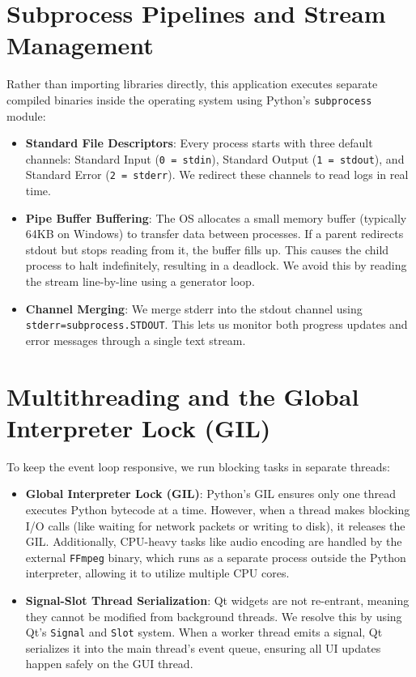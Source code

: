 \documentclass[12pt]{report}
\begin{document}
\section{Subprocess Pipelines and Stream Management}
Rather than importing libraries directly, this application executes separate compiled binaries inside the operating system using Python's \texttt{subprocess} module:
\begin{itemize}[leftmargin=*]
    \item \textbf{Standard File Descriptors}: Every process starts with three default channels: Standard Input (\texttt{0 = stdin}), Standard Output (\texttt{1 = stdout}), and Standard Error (\texttt{2 = stderr}). We redirect these channels to read logs in real time.
    \item \textbf{Pipe Buffer Buffering}: The OS allocates a small memory buffer (typically 64KB on Windows) to transfer data between processes. If a parent redirects stdout but stops reading from it, the buffer fills up. This causes the child process to halt indefinitely, resulting in a deadlock. We avoid this by reading the stream line-by-line using a generator loop.
    \item \textbf{Channel Merging}: We merge stderr into the stdout channel using \texttt{stderr=subprocess.STDOUT}. This lets us monitor both progress updates and error messages through a single text stream.
\end{itemize}

\section{Multithreading and the Global Interpreter Lock (GIL)}
To keep the event loop responsive, we run blocking tasks in separate threads:
\begin{itemize}[leftmargin=*]
    \item \textbf{Global Interpreter Lock (GIL)}: Python's GIL ensures only one thread executes Python bytecode at a time. However, when a thread makes blocking I/O calls (like waiting for network packets or writing to disk), it releases the GIL. Additionally, CPU-heavy tasks like audio encoding are handled by the external \texttt{FFmpeg} binary, which runs as a separate process outside the Python interpreter, allowing it to utilize multiple CPU cores.
    \item \textbf{Signal-Slot Thread Serialization}: Qt widgets are not re-entrant, meaning they cannot be modified from background threads. We resolve this by using Qt's \texttt{Signal} and \texttt{Slot} system. When a worker thread emits a signal, Qt serializes it into the main thread's event queue, ensuring all UI updates happen safely on the GUI thread.
\end{itemize}
\end{document}
